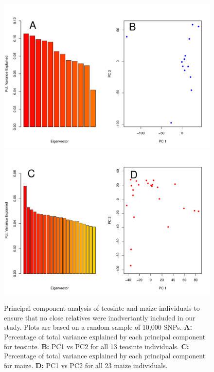\documentclass{pnastwo}
\begin{document}
\begin{article}
\begin{figure}
  \begin{center}
  \includegraphics[width=.75\textwidth]{FigsAndFiles/tilPCA_aug.pdf}\\
  \includegraphics[width=.75\textwidth]{FigsAndFiles/bknPCA_aug.pdf}\\
  \end{center}
  \caption{Principal component analysis of teosinte and maize individuals to ensure that no close relatives were inadvertantly included in our study. Plots are based on a random sample of 10,000 SNPs. {\bf A:} Percentage of total variance explained by each principal component for teosinte. {\bf B:} PC1 vs PC2 for all 13 teosinte individuals. {\bf C:} Percentage of total variance explained by each principal component for maize. {\bf D:} PC1 vs PC2 for all 23 maize individuals. \label{sFig:PCA}}
\end{figure}
\clearpage



\end{article}
\end{document}

